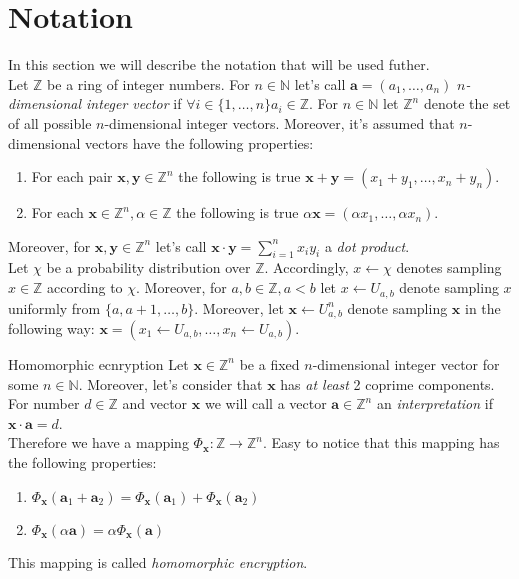 \section{Notation}
	In this section we will describe the notation that will be used futher. \\
	Let $ \mathbb{Z} $ be a ring of integer numbers. For $ n \in \mathbb{N} $ let's call $ \textbf{a} = (a_1, \dots, a_n) $ \textit{$ n $-dimensional integer vector} if $ \forall i \in \{1, \dots, n\} a_i \in \mathbb{Z} $. For $ n \in \mathbb{N} $ let $ \mathbb{Z}^n $ denote the set of all possible $ n $-dimensional integer vectors. Moreover, it's assumed that $ n $-dimensional vectors have the following properties:
	\begin{enumerate}
		\item For each pair $ \textbf{x}, \textbf{y} \in \mathbb{Z}^n $  the following is true $ \textbf{x} + \textbf{y} = (x_1 + y_1, \dots, x_n + y_n) $.
		\item For each $ \textbf{x} \in \mathbb{Z}^n, \alpha \in \mathbb{Z} $ the following is true $ \alpha \textbf{x} = (\alpha x_1, \dots, \alpha x_n) $.
	\end{enumerate}
	Moreover, for $ \textbf{x}, \textbf{y} \in \mathbb{Z}^n $ let's call $ \textbf{x} \cdot \textbf{y} = \sum\limits_{i = 1}^n x_i y_i $ a \textit{dot product}. \\
	Let $ \chi $ be a probability distribution over $ \mathbb{Z} $. Accordingly, $ x \leftarrow \chi $ denotes sampling $ x \in \mathbb{Z} $ according to $ \chi $. Moreover, for $ a, b \in \mathbb{Z}, a < b $ let $ x \leftarrow U_{a, b} $ denote sampling $ x $ uniformly from $ \{a, a+1, \dots, b\} $. Moreover, let $ \textbf{x} \leftarrow U_{a, b}^n $ denote sampling $ \textbf{x} $ in the following way: $ \textbf{x} = (x_1 \leftarrow U_{a, b}, \dots, x_n \leftarrow U_{a, b} ). $
	\begin{definition}{Homomorphic ecnryption}
		Let $ \textbf{x} \in \mathbb{Z}^n $ be a fixed $ n $-dimensional integer vector for some $ n \in \mathbb{N} $. Moreover, let's consider that $ \textbf{x} $ has \textit{at least} 2 coprime components. \\
		For number $ d \in \mathbb{Z} $ and vector $ \textbf{x} $ we will call a vector $ \textbf{a} \in \mathbb{Z}^n $ an \textit{interpretation} if $ \textbf{x} \cdot \textbf{a} = d $. \\
		Therefore we have a mapping $ \Phi_{\textbf{x}}: \mathbb{Z} \rightarrow \mathbb{Z}^n $. Easy to notice that this mapping has the following properties:
		\begin{enumerate}
			\item $ \Phi_{\textbf{x}}(\textbf{a}_1 + \textbf{a}_2) = \Phi_{\textbf{x}}(\textbf{a}_1) + \Phi_{\textbf{x}}(\textbf{a}_2) $
			\item $ \Phi_{\textbf{x}}(\alpha \textbf{a}) = \alpha \Phi_{\textbf{x}}(\textbf{a}) $
		\end{enumerate}
		This mapping is called \textit{homomorphic encryption}.
	\end{definition}

		